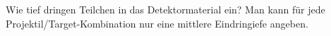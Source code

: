 Wie tief dringen Teilchen in das Detektormaterial ein? Man kann für jede
Projektil/Target-Kombination nur eine mittlere Eindringiefe angeben. 
